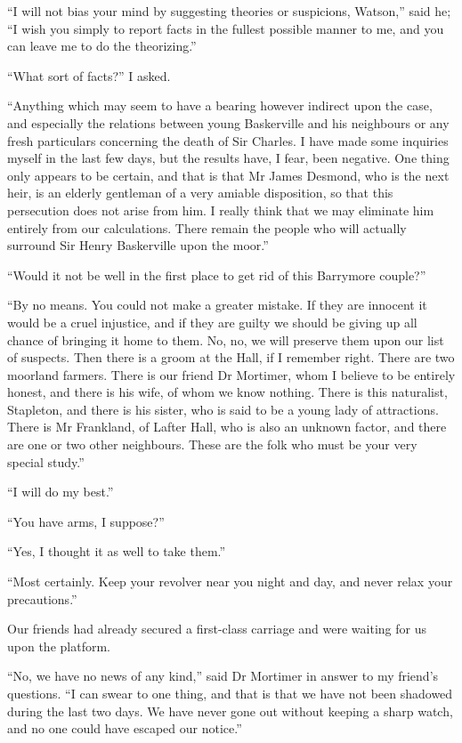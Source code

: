 \documentclass[paper=5.5in:8.5in,BCOR=7mm,twoside,DIV=calc,12pt,usegeometry,openany,chapterprefix,endperiod,headings=big]{scrbook} %
\begin{document}
\enquote{I will not bias your mind by suggesting theories or suspicions, Watson,} said he; \enquote{I wish you simply to report facts in the fullest possible manner to me, and you can leave me to do the theorizing.}

\enquote{What sort of facts?} I asked.

\enquote{Anything which may seem to have a bearing however indirect upon the case, and especially the relations between young Baskerville and his neighbours or any fresh particulars concerning the death of Sir Charles. I have made some inquiries myself in the last few days, but the results have, I fear, been negative. One thing only appears to be certain, and that is that Mr James Desmond, who is the next heir, is an elderly gentleman of a very amiable disposition, so that this persecution does not arise from him. I really think that we may eliminate him entirely from our calculations. There remain the people who will actually surround Sir Henry Baskerville upon the moor.}

\enquote{Would it not be well in the first place to get rid of this Barrymore couple?}

\enquote{By no means. You could not make a greater mistake. If they are innocent it would be a cruel injustice, and if they are guilty we should be giving up all chance of bringing it home to them. No, no, we will preserve them upon our list of suspects. Then there is a groom at the Hall, if I remember right. There are two moorland farmers. There is our friend Dr Mortimer, whom I believe to be entirely honest, and there is his wife, of whom we know nothing. There is this naturalist, Stapleton, and there is his sister, who is said to be a young lady of attractions. There is Mr Frankland, of Lafter Hall, who is also an unknown factor, and there are one or two other neighbours. These are the folk who must be your very special study.}

\enquote{I will do my best.}

\enquote{You have arms, I suppose?}

\enquote{Yes, I thought it as well to take them.}

\enquote{Most certainly. Keep your revolver near you night and day, and never relax your precautions.}

Our friends had already secured a first-class carriage and were waiting for us upon the platform.

\enquote{No, we have no news of any kind,} said Dr Mortimer in answer to my friend's questions. \enquote{I can swear to one thing, and that is that we have not been shadowed during the last two days. We have never gone out without keeping a sharp watch, and no one could have escaped our notice.}
\end{document}
